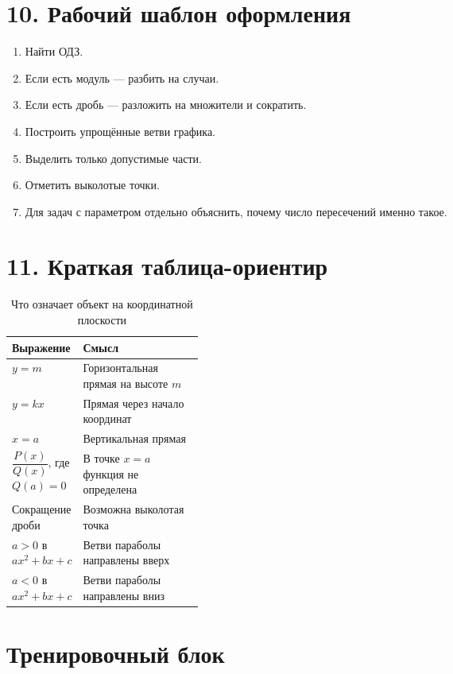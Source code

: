 \documentclass[a4paper,12pt]{article}
\begin{document}
\section*{\textcolor{darkaccent}{10. Рабочий шаблон оформления}}
\begin{enumerate}
	\item Найти ОДЗ.
	\item Если есть модуль --- разбить на случаи.
	\item Если есть дробь --- разложить на множители и сократить.
	\item Построить упрощённые ветви графика.
	\item Выделить только допустимые части.
	\item Отметить выколотые точки.
	\item Для задач с параметром отдельно объяснить, почему число пересечений именно такое.
\end{enumerate}

\section*{\textcolor{darkaccent}{11. Краткая таблица-ориентир}}
\renewcommand{\arraystretch}{1.35}
\begin{table}[h!]
\centering
\caption{Что означает объект на координатной плоскости}
\begin{tabularx}{\linewidth}{@{}>{\raggedright\arraybackslash}p{0.28\linewidth}X@{}}
\toprule
\textbf{Выражение} & \textbf{Смысл} \\
\midrule
\(y=m\) & Горизонтальная прямая на высоте \(m\) \\
\(y=kx\) & Прямая через начало координат \\
\(x=a\) & Вертикальная прямая \\
\(\dfrac{P(x)}{Q(x)}\), где \(Q(a)=0\) & В точке \(x=a\) функция не определена \\
Сокращение дроби & Возможна выколотая точка \\
\(a>0\) в \(ax^2+bx+c\) & Ветви параболы направлены вверх \\
\(a<0\) в \(ax^2+bx+c\) & Ветви параболы направлены вниз \\
\bottomrule
\end{tabularx}
\end{table}

\newpage

\section*{\textcolor{darkaccent}{Тренировочный блок}}
\end{document}
